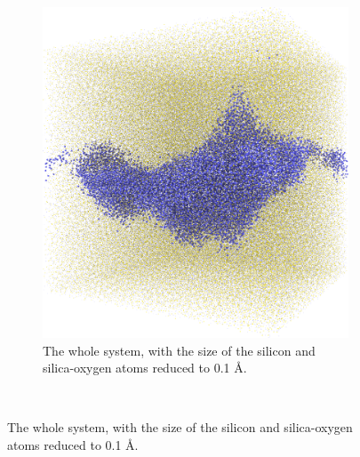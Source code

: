 \begin{figure}[!p]
{\begin{subfigure}[t]{\myfigwidth}
        \includegraphics[width=\textwidth]{images/systems/trimmed-rough_fracture01_abel_15}%
        \caption{The whole system, with the size of the silicon and silica-oxygen atoms reduced to 0.1 \AA.}%
    \end{subfigure}%
}%
    \vspace{10pt}\\%
\end{figure}
